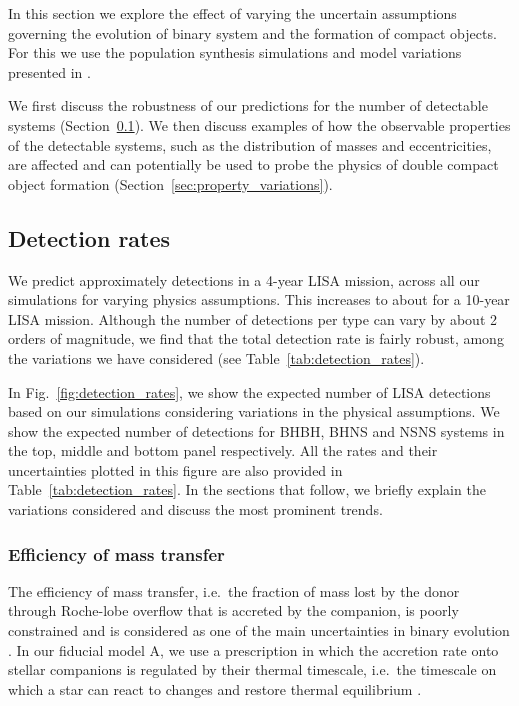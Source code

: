 In this section we explore the effect of varying the uncertain assumptions governing the evolution of binary system and the formation of compact objects. For this we use the population synthesis simulations and model variations presented in \citet{Broekgaarden+2021,Broekgaarden+2021b}.

We first discuss the robustness of our predictions for the number of detectable systems (Section~\ref{sec:detection_rate_analysis}). We then discuss examples of how the observable properties of the detectable systems, such as the distribution of masses and eccentricities, are affected and can potentially be used to probe the physics of double compact object formation (Section~\ref{sec:property_variations}).

\subsection{Detection rates}\label{sec:detection_rate_analysis}
We predict approximately \rangeFourYear{} detections in a 4-year LISA mission, across all our simulations for varying physics assumptions. This increases to about \rangeTenYear{} for a 10-year LISA mission. Although the number of detections per type can vary by about 2 orders of magnitude, we find that the total detection rate is fairly robust, among the variations we have considered (see Table~\ref{tab:detection_rates}).

In Fig.~\ref{fig:detection_rates}, we show the expected number of LISA detections based on our simulations considering variations in the physical assumptions. We show the expected number of detections for BHBH, BHNS and NSNS systems in the top, middle and bottom panel respectively. All the rates and their uncertainties plotted in this figure are also provided in Table~\ref{tab:detection_rates}. 
In the sections that follow, we briefly explain the variations considered and discuss the most prominent trends. 

\subsubsection{Efficiency of mass transfer}

The efficiency of mass transfer, i.e.\ the fraction of mass lost by the donor through Roche-lobe overflow that is accreted by the companion, is poorly constrained and is considered as one of the main uncertainties in binary evolution \citep[e.g.][]{deMink+2007}. In our fiducial model A, we use a prescription in which the accretion rate onto stellar companions is regulated by their thermal timescale, i.e.\ the timescale on which a star can react to changes and restore thermal equilibrium \citep[see e.g.][]{Schneider+2015}. 

